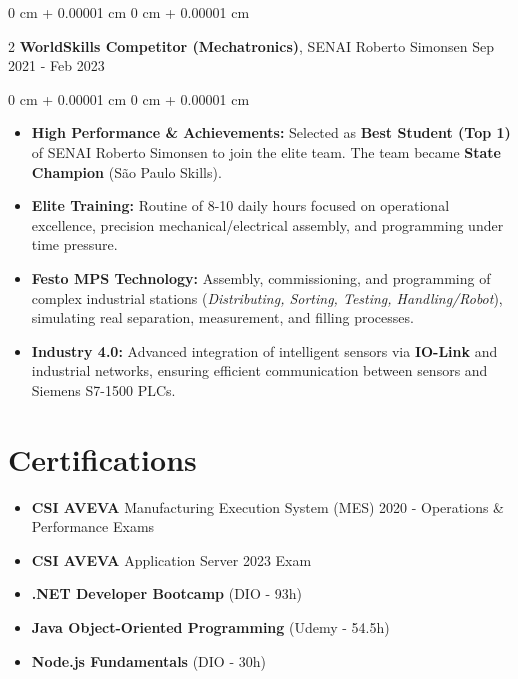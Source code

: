\documentclass[10pt, letterpaper]{article}
\newenvironment{highlights}{ \begin{itemize}[ topsep=0.10 cm, parsep=0.10 cm, partopsep=0pt,
itemsep=0pt, leftmargin=0 cm + 10pt ] }{ \end{itemize} } %
\newenvironment{onecolentry}{ \begin{adjustwidth}{ 0 cm + 0.00001 cm }{ 0 cm + 0.00001 cm }
}{ \end{adjustwidth} } %
\newenvironment{twocolentry}[2][]{ \onecolentry \def\secondColumn{#2} \setcolumnwidth{\fill, 4.5 cm}
\begin{paracol}{2} }{ \switchcolumn \raggedleft \secondColumn \end{paracol}
\endonecolentry } %
\begin{document}
    \vspace{0.2 cm}

    \begin{twocolentry}
		{ Sep 2021 - Feb 2023 } \textbf{WorldSkills Competitor (Mechatronics)}, SENAI Roberto Simonsen
	\end{twocolentry}
	
	\vspace{0.10 cm}
	\begin{onecolentry}
		\begin{highlights}
			\item \textbf{High Performance \& Achievements:} Selected as \textbf{Best Student (Top 1)} of SENAI Roberto Simonsen to join the elite team. The team became \textbf{State Champion} (São Paulo Skills).
            \item \textbf{Elite Training:} Routine of 8-10 daily hours focused on operational excellence, precision mechanical/electrical assembly, and programming under time pressure.
            \item \textbf{Festo MPS Technology:} Assembly, commissioning, and programming of complex industrial stations (\textit{Distributing, Sorting, Testing, Handling/Robot}), simulating real separation, measurement, and filling processes.
            \item \textbf{Industry 4.0:} Advanced integration of intelligent sensors via \textbf{IO-Link} and industrial networks, ensuring efficient communication between sensors and Siemens S7-1500 PLCs.
		\end{highlights}
	\end{onecolentry}
	
    \section{Certifications}
    
    \begin{highlights}
        \item \textbf{CSI AVEVA} Manufacturing Execution System (MES) 2020 - Operations \& Performance Exams
        \item \textbf{CSI AVEVA} Application Server 2023 Exam
        \item \textbf{.NET Developer Bootcamp} (DIO - 93h)
        \item \textbf{Java Object-Oriented Programming} (Udemy - 54.5h)
        \item \textbf{Node.js Fundamentals} (DIO - 30h)
    \end{highlights}
    
\end{document}
